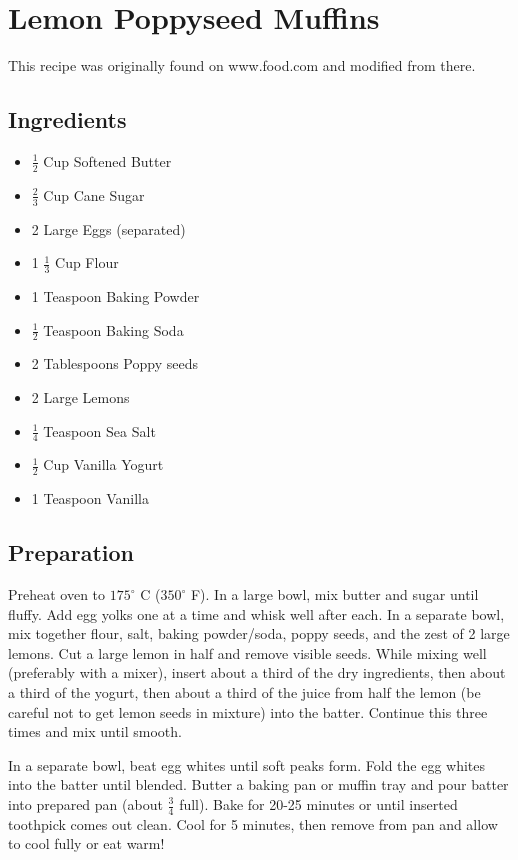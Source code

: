 \thispagestyle{fancy}
\section{Lemon Poppyseed Muffins}
\AddToShipoutPicture*{\LemonPoppyseed}

This recipe was originally found on www.food.com and modified from there.

\subsection*{Ingredients}
\begin{multicols}{3}
	\begin{itemize}
		\item $\frac{1}{2}$ Cup Softened Butter
		\item $\frac{2}{3}$ Cup Cane Sugar
		\item 2 Large Eggs (separated)
		\item 1 $\frac{1}{3}$ Cup Flour
		\item 1 Teaspoon Baking Powder
		\item $\frac{1}{2}$ Teaspoon Baking Soda
		\item 2 Tablespoons Poppy seeds
		\item 2 Large Lemons
		\item $\frac{1}{4}$ Teaspoon Sea Salt
		\item $\frac{1}{2}$ Cup Vanilla Yogurt
		\item 1 Teaspoon Vanilla
	\end{itemize}
\end{multicols}

\subsection*{Preparation}

Preheat oven to $175^\circ$ C ($350^\circ$ F). In a large bowl, mix butter and sugar until fluffy. Add egg yolks one at a time and whisk well after each. In a separate bowl, mix together flour, salt, baking powder/soda, poppy seeds, and the zest of 2 large lemons. Cut a large lemon in half and remove visible seeds. While mixing well (preferably with a mixer), insert about a third of the dry ingredients, then about a third of the yogurt, then about a third of the juice from half the lemon (be careful not to get lemon seeds in mixture) into the batter. Continue this three times and mix until smooth. 

\tab In a separate bowl, beat egg whites until soft peaks form. Fold the egg whites into the batter until blended. Butter a baking pan or muffin tray and pour batter into prepared pan (about $\frac{3}{4}$ full). Bake for 20-25 minutes or until inserted toothpick comes out clean. Cool for 5 minutes, then remove from pan and allow to cool fully or eat warm!

